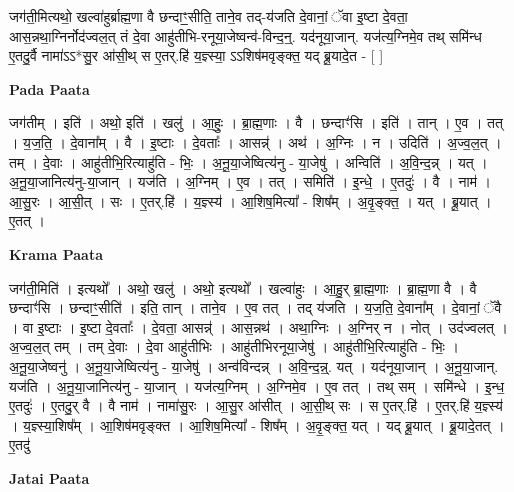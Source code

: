 \documentclass[17pt]{extarticle}
\begin{document}
जग॑ती॒मित्यथो॒ खल्वा॑हुर्ब्राह्म॒णा वै छन्दाꣳ॒॒सीति॒ ताने॒व तद्-य॑जति दे॒वानां॒ ॅवा इ॒ष्टा दे॒वता॒ आस॒न्नथा॒ग्निर्नोद॑ज्वल॒त् तं दे॒वा आहु॑तीभि-रनूया॒जेष्वन्व॑-विन्द॒न्॒. यद॑नूया॒जान्. यज॑त्य॒ग्निमे॒व तथ् समि॑न्ध ए॒तदु॒र्वै नामा॑ऽऽ*सु॒र आ॑सी॒थ् स ए॒तर्.हि॑ य॒ज्ञ्स्या॒ ऽऽशिष॑मवृङ्क्त॒ यद् ब्रू॒यादे॒त - [  ] \newline

\textbf{Pada Paata} \newline

जग॑तीम् । इति॑ । अथो॒ इति॑ । खलु॑ । आ॒हुः॒ । ब्रा॒ह्म॒णाः । वै । छन्दाꣳ॑सि । इति॑ । तान् । ए॒व । तत् । य॒ज॒ति॒ । दे॒वाना᳚म् । वै । इ॒ष्टाः । दे॒वताः᳚ । आसन्न्॑ । अथ॑ । अ॒ग्निः । न । उदिति॑ । अ॒ज्व॒ल॒त् । तम् । दे॒वाः । आहु॑तीभि॒रित्याहु॑ति - भिः॒ । अ॒नू॒या॒जेष्वित्य॑नु - या॒जेषु॑ । अन्विति॑ । अ॒वि॒न्द॒न्न् । यत् । अ॒नू॒या॒जानित्य॑नु-या॒जान् । यज॑ति । अ॒ग्निम् । ए॒व । तत् । समिति॑ । इ॒न्धे॒ । ए॒तदुः॑ । वै । नाम॑ । आ॒सु॒रः । आ॒सी॒त् । सः । ए॒तर्.हि॑ । य॒ज्ञ्स्य॑ । आ॒शिष॒मित्या᳚ - शिष᳚म् । अ॒वृ॒ङ्क्त॒ । यत् । ब्रू॒यात् । ए॒तत् ।  \newline


\textbf{Krama Paata} \newline

जग॑ती॒मिति॑ । इत्यथो᳚ । अथो॒ खलु॑ । अथो॒ इत्यथो᳚ । खल्वा॑हुः । आ॒हु॒र् ब्रा॒ह्म॒णाः । ब्रा॒ह्म॒णा वै । वै छन्दाꣳ॑सि । छन्दाꣳ॒॒सीति॑ । इति॒ तान् । ताने॒व । ए॒व तत् । तद् य॑जति । य॒ज॒ति॒ दे॒वाना᳚म् । दे॒वानां॒ ॅवै । वा इ॒ष्टाः । इ॒ष्टा दे॒वताः᳚ । दे॒वता॒ आसन्न्॑ । आस॒न्नथ॑ । अथा॒ग्निः । अ॒ग्निर् न । नोत् । उद॑ज्वलत् । अ॒ज्व॒ल॒त् तम् । तम् दे॒वाः । दे॒वा आहु॑तीभिः । आहु॑तीभिरनूया॒जेषु॑ । आहु॑तीभि॒रित्याहु॑ति - भिः॒ । अ॒नू॒या॒जेष्वनु॑ । अ॒नू॒या॒जेष्वित्य॑नु - या॒जेषु॑ । अन्व॑विन्दन्न् । अ॒वि॒न्द॒न्न्॒. यत् । यद॑नूया॒जान् । अ॒नू॒या॒जान्. यज॑ति । अ॒नू॒या॒जानित्य॑नु - या॒जान् । यज॑त्य॒ग्निम् । अ॒ग्निमे॒व । ए॒व तत् । तथ् सम् । समि॑न्धे । इ॒न्ध॒ ए॒तदुः॑ । ए॒तदु॒र् वै । वै नाम॑ । नामा॑सु॒रः । आ॒सु॒र आ॑सीत् । आ॒सी॒थ् सः । स ए॒तर्.हि॑ । ए॒तर्.हि॑ य॒ज्ञ्स्य॑ । य॒ज्ञ्स्या॒शिष᳚म् । आ॒शिष॑मवृङ्क्त । आ॒शिष॒मित्या᳚ - शिष᳚म् । अ॒वृ॒ङ्क्त॒ यत् । यद् ब्रू॒यात् । ब्रू॒यादे॒तत् । ए॒तदु॑ \newline

\textbf{Jatai Paata} \newline
\end{document}
